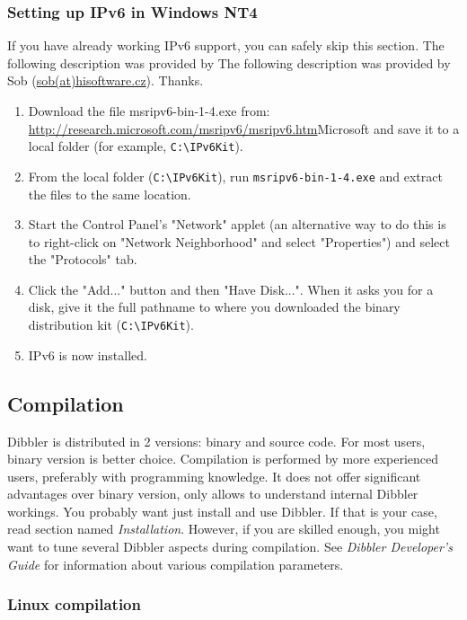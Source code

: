 \subsubsection{Setting up IPv6 in Windows NT4}
If you have already working IPv6 support, you can safely skip this
section.  The following description was provided by The following
description was provided by Sob
(\href{mailto:sob(at)hisoftware.cz}{sob(at)hisoftware.cz}). Thanks.

\begin{enumerate}
  \item Download the file msripv6-bin-1-4.exe from:
    \url{http://research.microsoft.com/msripv6/msripv6.htm}{Microsoft}
    and save it to a local folder (for example, \verb+C:\IPv6Kit+).
  \item From the local folder (\verb+C:\IPv6Kit+), run
    \verb+msripv6-bin-1-4.exe+ and extract the files to the same
    location.
  \item Start the Control Panel's "Network" applet (an alternative way to do this is
    to right-click on "Network Neighborhood" and select "Properties") and select
    the "Protocols" tab.
  \item Click the "Add..." button and then "Have Disk...". When it asks you for
    a disk, give it the full pathname to where you downloaded the binary
    distribution kit (\verb+C:\IPv6Kit+).
  \item IPv6 is now installed.
\end{enumerate}

\subsection{Compilation}
Dibbler is distributed in 2 versions: binary and source code. For
most users, binary version is better choice.  Compilation is
performed by more experienced users, preferably with programming
knowledge. It does not offer significant advantages over binary version,
only allows to understand internal Dibbler workings. You probably want
just install and use Dibbler. If that is your case, read section
named \emph{Installation}. However, if you are skilled enough, you might
want to tune several Dibbler aspects during compilation. See \emph{
Dibbler Developer's Guide} for information about various compilation parameters.

\subsubsection{Linux compilation}

